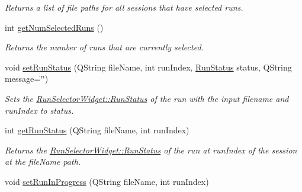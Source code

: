 \begin{DoxyCompactItemize}
\begin{DoxyCompactList}\small\item\em Returns a list of file paths for all sessions that have selected runs. \end{DoxyCompactList}\item 
\hypertarget{class_picto_1_1_run_selector_widget_a979e555618bac5d85d367618f7c4bc62}{int \hyperlink{class_picto_1_1_run_selector_widget_a979e555618bac5d85d367618f7c4bc62}{get\-Num\-Selected\-Runs} ()}\label{class_picto_1_1_run_selector_widget_a979e555618bac5d85d367618f7c4bc62}

\begin{DoxyCompactList}\small\item\em Returns the number of runs that are currently selected. \end{DoxyCompactList}\item 
void \hyperlink{class_picto_1_1_run_selector_widget_a09923e99306989b6a5b6a0f9a68e6147}{set\-Run\-Status} (Q\-String file\-Name, int run\-Index, \hyperlink{class_picto_1_1_run_selector_widget_ac540ab59a379b3bfb5534ecde54dc2aa}{Run\-Status} status, Q\-String message=\char`\"{}\char`\"{})
\begin{DoxyCompactList}\small\item\em Sets the \hyperlink{class_picto_1_1_run_selector_widget_ac540ab59a379b3bfb5534ecde54dc2aa}{Run\-Selector\-Widget\-::\-Run\-Status} of the run with the input filename and run\-Index to status. \end{DoxyCompactList}\item 
\hypertarget{class_picto_1_1_run_selector_widget_a3fc69bc267242cbdcf38d73178e9b74e}{int \hyperlink{class_picto_1_1_run_selector_widget_a3fc69bc267242cbdcf38d73178e9b74e}{get\-Run\-Status} (Q\-String file\-Name, int run\-Index)}\label{class_picto_1_1_run_selector_widget_a3fc69bc267242cbdcf38d73178e9b74e}

\begin{DoxyCompactList}\small\item\em Returns the \hyperlink{class_picto_1_1_run_selector_widget_ac540ab59a379b3bfb5534ecde54dc2aa}{Run\-Selector\-Widget\-::\-Run\-Status} of the run at run\-Index of the session at the file\-Name path. \end{DoxyCompactList}\item 
\hypertarget{class_picto_1_1_run_selector_widget_ab7d9054828e5cd574fccac7097780365}{void \hyperlink{class_picto_1_1_run_selector_widget_ab7d9054828e5cd574fccac7097780365}{set\-Run\-In\-Progress} (Q\-String file\-Name, int run\-Index)}\label{class_picto_1_1_run_selector_widget_ab7d9054828e5cd574fccac7097780365}


\end{DoxyCompactItemize}
